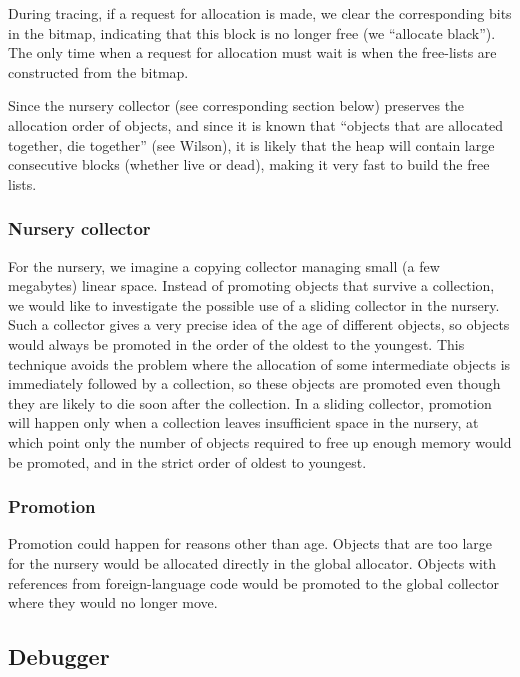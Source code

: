 \documentclass{article}
\begin{document}
During tracing, if a request for allocation is made, we clear the
corresponding bits in the bitmap, indicating that this block is no
longer free (we ``allocate black'').  The only time when a request for
allocation must wait is when the free-lists are constructed from the
bitmap. 

Since the nursery collector (see corresponding section below) preserves
the allocation order of objects, and since it is known that ``objects
that are allocated together, die together'' (see Wilson), it is likely
that the heap will contain large consecutive blocks (whether live or
dead), making it very fast to build the free lists. 

\subsubsection{Nursery collector}
For the nursery, we imagine a copying collector managing small (a few
megabytes) linear space.  Instead of promoting objects that survive a
collection, we would like to investigate the possible use of a sliding
collector in the nursery.  Such a collector gives a very precise idea
of the age of different objects, so objects would always be promoted
in the order of the oldest to the youngest.  This technique avoids the
problem where the allocation of some intermediate objects is
immediately followed by a collection, so these objects are promoted
even though they are likely to die soon after the collection.  In a
sliding collector, promotion will happen only when a collection leaves
insufficient space in the nursery, at which point only the number of
objects required to free up enough memory would be promoted, and in
the strict order of oldest to youngest. 

\subsubsection{Promotion}

Promotion could happen for reasons other than age.  Objects that are
too large for the nursery would be allocated directly in the global
allocator.  Objects with references from foreign-language code would
be promoted to the global collector where they would no longer move.

\subsection{Debugger}
\label{section-debugging}
\end{document}
